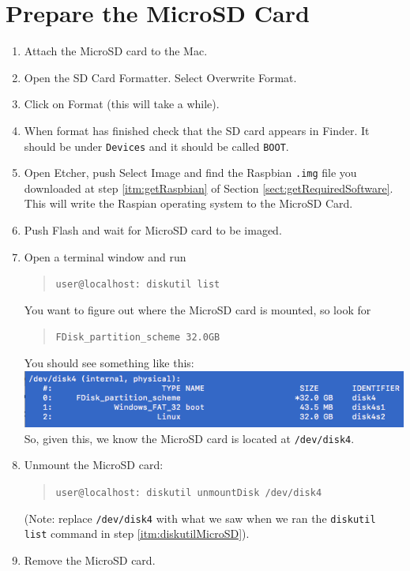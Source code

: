 \documentclass[11pt,oneside]{article}
\makeatletter
\newcommand{\localCommand}[1]{\begin{quote} \texttt{user@localhost: #1} \end{quote}}
\newcommand{\xtermPartialOutput}[1]{\begin{verse} \texttt{#1} \end{verse}}
\makeatother
\begin{document}
\section{Prepare the MicroSD Card} \label{sect:prepareMicroSDCard}
\begin{enumerate}
	\item Attach the MicroSD card to the Mac.
	\item \label{itm:msdFormat} Open the SD Card Formatter.  Select Overwrite Format.
	\item \label{itm:msdDoFormat} Click on Format (this will take a while).
	\item When format has finished check that the SD card appears in Finder.  It should be under \texttt{Devices} and it should be called \texttt{BOOT}.
	\item \label{itm:msdEtcher} Open Etcher, push Select Image and find the Raspbian \texttt{.img} file you downloaded at step \ref{itm:getRaspbian} of Section
	\ref{sect:getRequiredSoftware}.  This will write the Raspian operating system to the MicroSD Card.
	\item \label{itm:msdDoEtcher} Push Flash and wait for MicroSD card to be imaged.
	\item \label{itm:diskutilMicroSD} Open a terminal window and run
	\localCommand{diskutil list}
	You want to figure out where the MicroSD card is mounted, so look for \xtermPartialOutput{FDisk\_partition\_scheme 32.0GB}  You should see something like this:\\
	\includegraphics[scale=0.9]{diskutil1.png}\\
	So, given this, we know the MicroSD card is located at \texttt{/dev/disk4}.
	\item \label{itm:unmountMicroSD} Unmount the MicroSD card:
	\localCommand{diskutil unmountDisk /dev/disk4}
	(Note: replace \texttt{/dev/disk4} with what we saw when we ran the \texttt{diskutil list} command in step \ref{itm:diskutilMicroSD}).
	\item \label{itm:removeMicroSD} Remove the MicroSD card.
\end{enumerate}
\end{document}

